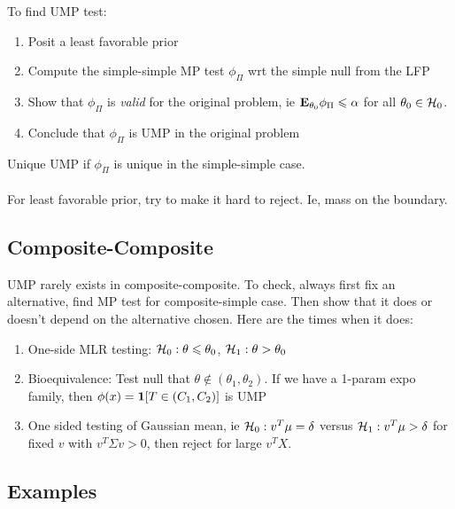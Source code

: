 \documentclass{article}
\begin{document}
\begin{recipe}

To find UMP test:
\begin{enumerate}
	\item Posit a least favorable prior
	\item Compute the simple-simple MP test $\phi_\Pi$ wrt the simple null from the LFP
	\item Show that $\phi_\Pi$ is \textit{valid} for the original problem, ie $\mathbf{E}_{\theta_0} \phi_\Pi \leqslant \alpha$ for all $\theta_0 \in \mathcal H_0$.
	\item Conclude that $\phi_\Pi$ is UMP in the original problem
\end{enumerate}
Unique UMP if $\phi_\Pi$ is unique in the simple-simple case.\\\\
For least favorable prior, try to make it hard to reject. Ie, mass on the boundary. 
\end{recipe}
\subsection{Composite-Composite}
UMP rarely exists in composite-composite. To check, always first fix an alternative, find MP test for composite-simple case. Then show that it does or doesn't depend on the alternative chosen. Here are the times when it does:

\begin{enumerate}
	\item One-side MLR testing: $\mathcal H_0: \theta\leqslant \theta_0$, $\mathcal H_1: \theta>\theta_0$
	\item Bioequivalence: Test null that $\theta \notin (\theta_1,\theta_2)$. If we have a 1-param expo family, then $\phi(x) = \boldsymbol{1}[T\in (C_1, C_2)]$ is UMP
	\item One sided testing of Gaussian mean, ie $\mathcal H_0: v^T \mu = \delta$ versus $\mathcal H_1: v^T \mu >\delta$ for fixed $v$ with $v^T \Sigma v>0$, then reject for large $v^T X$. 
\end{enumerate}


\subsection{Examples}
\end{document}
